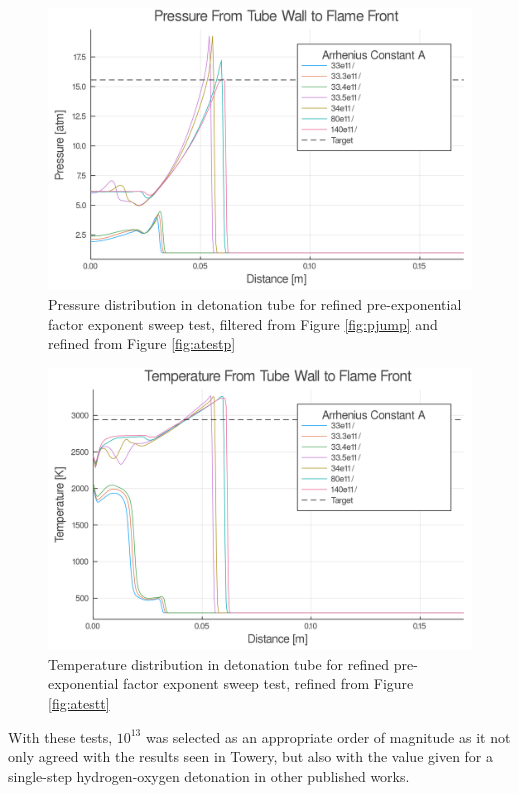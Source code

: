 \begin{figure}
\centering
\includegraphics[width=0.85\linewidth]{./figs/Atest_refined/p.png}
\caption{Pressure distribution in detonation tube for refined pre-exponential factor exponent sweep test, filtered from Figure \ref{fig:pjump} and refined from Figure \ref{fig:atestp}}
\label{fig:atestrp}
\end{figure}

\begin{figure}
\centering
\includegraphics[width=0.85\linewidth]{./figs/Atest_refined/t.png}
\caption{Temperature distribution in detonation tube for refined pre-exponential factor exponent sweep test, refined from Figure \ref{fig:atestt}}
\label{fig:atestrt}
\end{figure}

With these tests, \(10^{13}\) was selected as an appropriate order of magnitude as it not only agreed with the results seen in Towery\cite{towery1}, but also with the value given for a single-step hydrogen-oxygen detonation in other published works\cite{hashemi}. 




